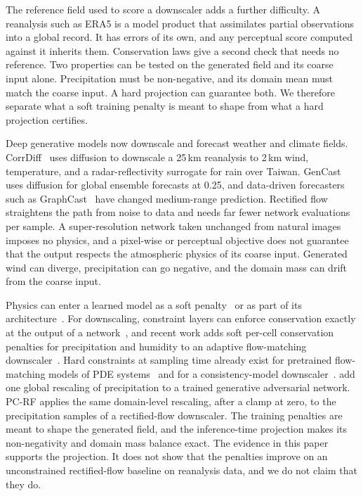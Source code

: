 \documentclass[sigconf,nonacm]{acmart}
\newcommand{\pcrf}{\textsc{PC-RF}\xspace}
\begin{document}
The reference field used to score a downscaler adds a further difficulty. A reanalysis such as ERA5 is a model product that assimilates partial observations into a global record. It has errors of its own, and any perceptual score computed against it inherits them. Conservation laws give a second check that needs no reference. Two properties can be tested on the generated field and its coarse input alone. Precipitation must be non-negative, and its domain mean must match the coarse input. A hard projection can guarantee both. We therefore separate what a soft training penalty is meant to shape from what a hard projection certifies.

Deep generative models now downscale and forecast weather and climate fields. CorrDiff~\citep{mardani2023residual} uses diffusion to downscale a 25\,km reanalysis to 2\,km wind, temperature, and a radar-reflectivity surrogate for rain over Taiwan. GenCast~\citep{price2023gencast} uses diffusion for global ensemble forecasts at 0.25\textdegree, and data-driven forecasters such as GraphCast~\citep{lam2023graphcast} have changed medium-range prediction. Rectified flow~\citep{liu2022flow,lipman2022flow} straightens the path from noise to data and needs far fewer network evaluations per sample. A super-resolution network taken unchanged from natural images imposes no physics, and a pixel-wise or perceptual objective does not guarantee that the output respects the atmospheric physics of its coarse input. Generated wind can diverge, precipitation can go negative, and the domain mass can drift from the coarse input.

Physics can enter a learned model as a soft penalty~\citep{raissi2019physics} or as part of its architecture~\citep{kochkov2021machine,kohler2020equivariant}. For downscaling, constraint layers can enforce conservation exactly at the output of a network~\citep{harder2023hard}, and recent work adds soft per-cell conservation penalties for precipitation and humidity to an adaptive flow-matching downscaler~\citep{debeire2026physics}. Hard constraints at sampling time already exist for pretrained flow-matching models of PDE systems~\citep{cheng2025gradient,utkarsh2025physics} and for a consistency-model downscaler~\citep{bochow2026physics}. \citet{hess2022physically} add one global rescaling of precipitation to a trained generative adversarial network. \pcrf applies the same domain-level rescaling, after a clamp at zero, to the precipitation samples of a rectified-flow downscaler. The training penalties are meant to shape the generated field, and the inference-time projection makes its non-negativity and domain mass balance exact. The evidence in this paper supports the projection. It does not show that the penalties improve on an unconstrained rectified-flow baseline on reanalysis data, and we do not claim that they do.
\end{document}
